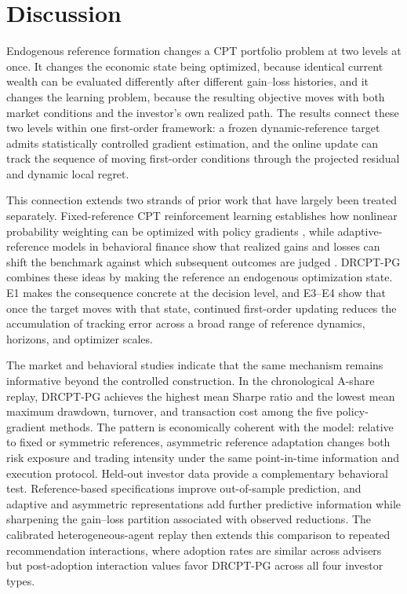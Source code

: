 \section{Discussion}\label{sec:discussion}

Endogenous reference formation changes a CPT portfolio problem at two levels at once.  It changes the economic state being optimized, because identical current wealth can be evaluated differently after different gain--loss histories, and it changes the learning problem, because the resulting objective moves with both market conditions and the investor's own realized path.  The results connect these two levels within one first-order framework: a frozen dynamic-reference target admits statistically controlled gradient estimation, and the online update can track the sequence of moving first-order conditions through the projected residual and dynamic local regret.

This connection extends two strands of prior work that have largely been treated separately.  Fixed-reference CPT reinforcement learning establishes how nonlinear probability weighting can be optimized with policy gradients \citep{prashanth2016cumulative,lepel2026policygradients}, while adaptive-reference models in behavioral finance show that realized gains and losses can shift the benchmark against which subsequent outcomes are judged \citep{arkes2008reference,he2019realization,qin2022realization,gao2024multiperiod}.  DRCPT-PG combines these ideas by making the reference an endogenous optimization state.  E1 makes the consequence concrete at the decision level, and E3--E4 show that once the target moves with that state, continued first-order updating reduces the accumulation of tracking error across a broad range of reference dynamics, horizons, and optimizer scales.

The market and behavioral studies indicate that the same mechanism remains informative beyond the controlled construction.  In the chronological A-share replay, DRCPT-PG achieves the highest mean Sharpe ratio and the lowest mean maximum drawdown, turnover, and transaction cost among the five policy-gradient methods.  The pattern is economically coherent with the model: relative to fixed or symmetric references, asymmetric reference adaptation changes both risk exposure and trading intensity under the same point-in-time information and execution protocol.  Held-out investor data provide a complementary behavioral test.  Reference-based specifications improve out-of-sample prediction, and adaptive and asymmetric representations add further predictive information while sharpening the gain--loss partition associated with observed reductions.  The calibrated heterogeneous-agent replay then extends this comparison to repeated recommendation interactions, where adoption rates are similar across advisers but post-adoption interaction values favor DRCPT-PG across all four investor types.

